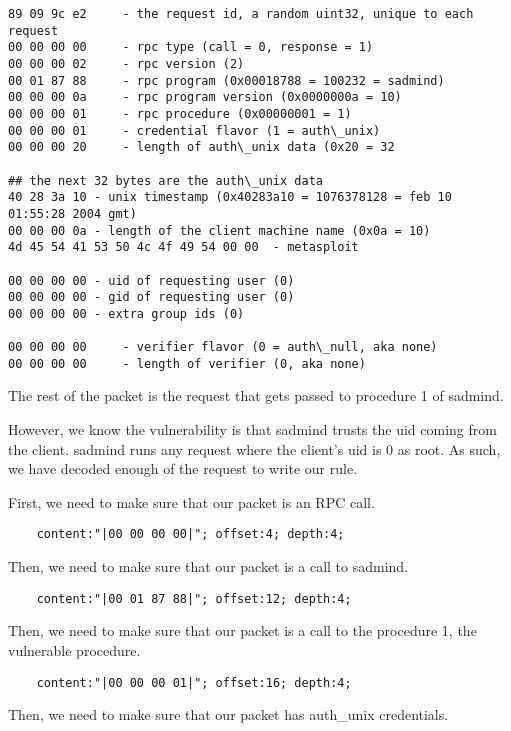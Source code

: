 \documentclass[english]{report}
\begin{document}
\begin{verbatim}
89 09 9c e2     - the request id, a random uint32, unique to each request
00 00 00 00     - rpc type (call = 0, response = 1)
00 00 00 02     - rpc version (2)
00 01 87 88     - rpc program (0x00018788 = 100232 = sadmind)
00 00 00 0a     - rpc program version (0x0000000a = 10)
00 00 00 01     - rpc procedure (0x00000001 = 1)
00 00 00 01     - credential flavor (1 = auth\_unix)
00 00 00 20     - length of auth\_unix data (0x20 = 32

## the next 32 bytes are the auth\_unix data
40 28 3a 10 - unix timestamp (0x40283a10 = 1076378128 = feb 10 01:55:28 2004 gmt)
00 00 00 0a - length of the client machine name (0x0a = 10)
4d 45 54 41 53 50 4c 4f 49 54 00 00  - metasploit

00 00 00 00 - uid of requesting user (0)
00 00 00 00 - gid of requesting user (0)
00 00 00 00 - extra group ids (0)

00 00 00 00     - verifier flavor (0 = auth\_null, aka none)
00 00 00 00     - length of verifier (0, aka none)
\end{verbatim}

The rest of the packet is the request that gets passed to procedure 1 of
sadmind.

However, we know the vulnerability is that sadmind trusts the uid coming from
the client.  sadmind runs any request where the client's uid is 0 as root.  As
such, we have decoded enough of the request to write our rule.  

First, we need to make sure that our packet is an RPC call.
    
\begin{verbatim}
    content:"|00 00 00 00|"; offset:4; depth:4;
\end{verbatim}

Then, we need to make sure that our packet is a call to sadmind.
    
\begin{verbatim}
    content:"|00 01 87 88|"; offset:12; depth:4;
\end{verbatim}

Then, we need to make sure that our packet is a call to the procedure 1, the
vulnerable procedure.  
   
\begin{verbatim}
    content:"|00 00 00 01|"; offset:16; depth:4;
\end{verbatim}

Then, we need to make sure that our packet has auth\_unix credentials.  
    
\end{document}
